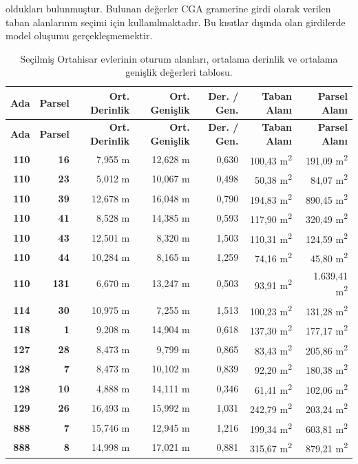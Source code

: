 \documentclass[12pt,turkish,a4paperpaper,]{report}
\begin{document}
oldukları bulunmuştur. Bulunan değerler CGA gramerine girdi olarak
verilen taban alanlarının seçimi için kullanılmaktadır. Bu kısıtlar
dışında olan girdilerde model oluşumu gerçekleşmemektir. \newpage

\begin{longtable}[]{@{}rrrrrrr@{}}
\caption{Seçilmiş Ortahisar evlerinin oturum alanları, ortalama derinlik
ve ortalama genişlik değerleri tablosu.
\label{EvlerAlanlarOrtalamalar}}\tabularnewline
\toprule
\textbf{Ada} & \textbf{Parsel} & \textbf{Ort. Derinlik} & \textbf{Ort.
Genişlik} & \textbf{Der. / Gen.} & \textbf{Taban Alanı} & \textbf{Parsel
Alanı}\tabularnewline
\midrule
\endfirsthead
\toprule
\textbf{Ada} & \textbf{Parsel} & \textbf{Ort. Derinlik} & \textbf{Ort.
Genişlik} & \textbf{Der. / Gen.} & \textbf{Taban Alanı} & \textbf{Parsel
Alanı}\tabularnewline
\midrule
\endhead
\textbf{110} & \textbf{16} & 7,955 m & 12,628 m & 0,630 & 100,43
m\textsuperscript{2} & 191,09 m\textsuperscript{2}\tabularnewline
\textbf{110} & \textbf{23} & 5,012 m & 10,067 m & 0,498 & 50,38
m\textsuperscript{2} & 84,07 m\textsuperscript{2}\tabularnewline
\textbf{110} & \textbf{39} & 12,678 m & 16,048 m & 0,790 & 194,83
m\textsuperscript{2} & 890,45 m\textsuperscript{2}\tabularnewline
\textbf{110} & \textbf{41} & 8,528 m & 14,385 m & 0,593 & 117,90
m\textsuperscript{2} & 320,49 m\textsuperscript{2}\tabularnewline
\textbf{110} & \textbf{43} & 12,501 m & 8,320 m & 1,503 & 110,31
m\textsuperscript{2} & 124,59 m\textsuperscript{2}\tabularnewline
\textbf{110} & \textbf{44} & 10,284 m & 8,165 m & 1,259 & 74,16
m\textsuperscript{2} & 45,80 m\textsuperscript{2}\tabularnewline
\textbf{110} & \textbf{131} & 6,670 m & 13,247 m & 0,503 & 93,91
m\textsuperscript{2} & 1.639,41 m\textsuperscript{2}\tabularnewline
\textbf{114} & \textbf{30} & 10,975 m & 7,255 m & 1,513 & 100,23
m\textsuperscript{2} & 131,28 m\textsuperscript{2}\tabularnewline
\textbf{118} & \textbf{1} & 9,208 m & 14,904 m & 0,618 & 137,30
m\textsuperscript{2} & 177,17 m\textsuperscript{2}\tabularnewline
\textbf{127} & \textbf{28} & 8,473 m & 9,799 m & 0,865 & 83,43
m\textsuperscript{2} & 205,86 m\textsuperscript{2}\tabularnewline
\textbf{128} & \textbf{7} & 8,473 m & 10,102 m & 0,839 & 92,20
m\textsuperscript{2} & 180,38 m\textsuperscript{2}\tabularnewline
\textbf{128} & \textbf{10} & 4,888 m & 14,111 m & 0,346 & 61,41
m\textsuperscript{2} & 102,06 m\textsuperscript{2}\tabularnewline
\textbf{129} & \textbf{26} & 16,493 m & 15,992 m & 1,031 & 242,79
m\textsuperscript{2} & 203,24 m\textsuperscript{2}\tabularnewline
\textbf{888} & \textbf{7} & 15,746 m & 12,945 m & 1,216 & 199,34
m\textsuperscript{2} & 603,81 m\textsuperscript{2}\tabularnewline
\textbf{888} & \textbf{8} & 14,998 m & 17,021 m & 0,881 & 315,67
m\textsuperscript{2} & 879,21 m\textsuperscript{2}\tabularnewline
\bottomrule
\end{longtable}
\end{document}

